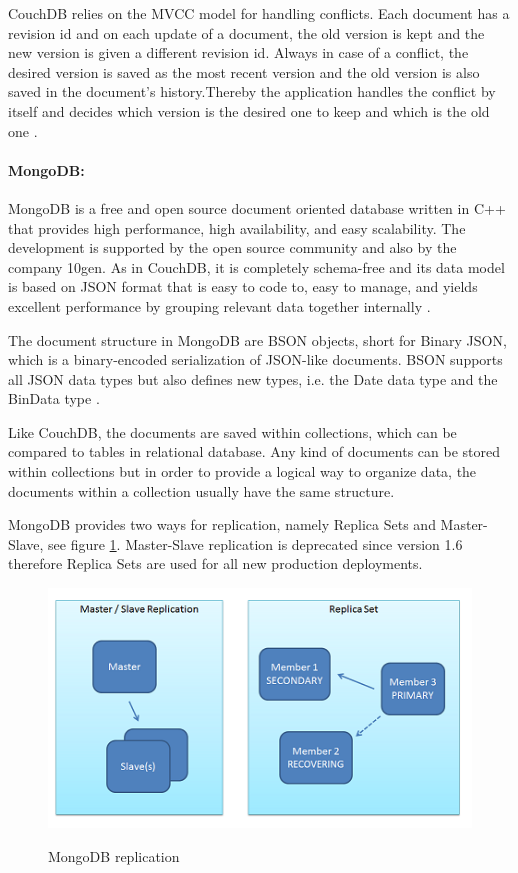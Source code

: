 CouchDB relies on the MVCC model for handling conflicts. Each document has a revision id and on each update of a document, the old version is kept and the new version is given a different revision id. Always in case of a conflict, the desired version is saved as the most recent version and the old version is also saved in the document's history.Thereby the application handles the conflict by itself and decides which version is the desired one to keep and which is the old one \cite{books/daglib/0024051}.

\paragraph{MongoDB:\label{sec:back_mongo}}
MongoDB is a free and open source document oriented database written in C++ that provides high performance, high availability, and easy scalability. The development is supported by the open source community and also by the company 10gen. As in CouchDB, it is completely schema-free and its data model is based on JSON format  that is easy to code to, easy to manage, and yields excellent performance by grouping relevant data together internally \cite{mongodb_intro}. 

The document structure in MongoDB are BSON objects, short for Binary JSON, which is a binary-encoded serialization of JSON-like documents.  BSON supports all JSON data types but also defines new types, i.e. the Date data type and the BinData type \cite{bson_intro}.

Like CouchDB, the documents are saved within collections, which can be compared to tables in relational database. Any kind of documents can be stored within collections but in order to provide a logical way to organize data, the documents within a collection usually have the same structure.

MongoDB provides two ways for replication, namely Replica Sets and Master-Slave, see figure \ref{fig:mongodb_repl}. Master-Slave replication is deprecated since version 1.6 therefore Replica Sets are used for all new production deployments.

\begin{figure}[htb]
  \centering
  \includegraphics{mongodb_repl.png}\\
  \caption{MongoDB replication}
  \label{fig:mongodb_repl}
  \protect\cite{mongodb_replication}
\end{figure}

